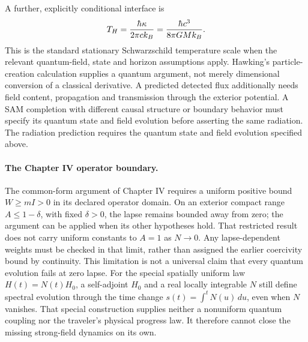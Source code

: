 \documentclass[10pt,twocolumn,letterpaper]{article}
\renewcommand{\hbar}{\mathchar'26\mkern-9mu h}
\begin{document}
A further, explicitly conditional interface is
\begin{equation}
 T_H=\frac{\hbar\kappa}{2\pi c k_B}
     =\frac{\hbar c^3}{8\pi GMk_B}.
 \label{eq:closure-temperature}
\end{equation}
This is the standard stationary Schwarzschild temperature scale when the relevant quantum-field, state and horizon assumptions apply. Hawking's particle-creation calculation supplies a quantum argument, not merely dimensional conversion of a classical derivative.\cite{hawking} A predicted detected flux additionally needs field content, propagation and transmission through the exterior potential. A SAM completion with different causal structure or boundary behavior must specify its quantum state and field evolution before asserting the same radiation. The radiation prediction requires the quantum state and field evolution specified above.

\paragraph{The Chapter IV operator boundary.}
The common-form argument of Chapter IV requires a uniform positive bound
$W\geq mI>0$ in its declared operator domain. On an exterior compact range
$A\leq1-\delta$, with fixed $\delta>0$, the lapse remains bounded away from
zero; the argument can be applied when its other hypotheses hold. That
restricted result does not carry uniform constants to $A=1$ as $N\to0$.
Any lapse-dependent weights must be checked in that limit, rather than
assigned the earlier coercivity bound by continuity. This limitation is
not a universal claim that every quantum evolution fails at zero lapse.
For the special spatially uniform law $H(t)=N(t)H_0$, a self-adjoint $H_0$
and a real locally integrable $N$ still define spectral evolution through
the time change $s(t)=\int^t N(u)\,du$, even when $N$ vanishes. That special
construction supplies neither a nonuniform quantum coupling nor the
traveler's physical progress law. It therefore cannot close the missing
strong-field dynamics on its own.
\end{document}

